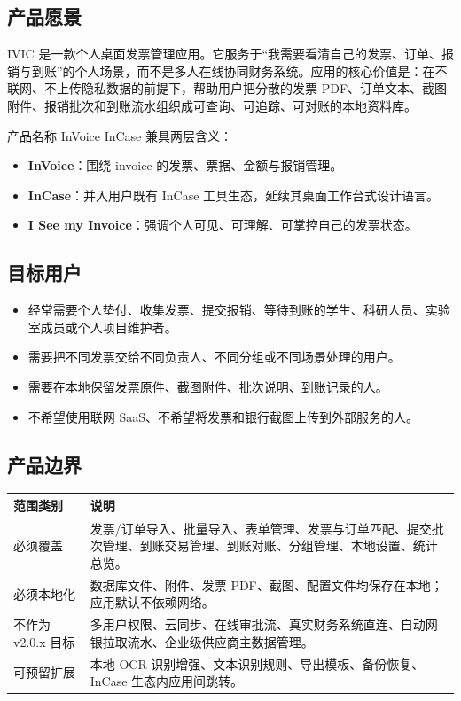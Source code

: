 \documentclass[UTF8,zihao=-4]{ctexart}
\begin{document}
\subsection{产品愿景}

IVIC 是一款个人桌面发票管理应用。它服务于“我需要看清自己的发票、订单、报销与到账”的个人场景，而不是多人在线协同财务系统。应用的核心价值是：在不联网、不上传隐私数据的前提下，帮助用户把分散的发票 PDF、订单文本、截图附件、报销批次和到账流水组织成可查询、可追踪、可对账的本地资料库。

产品名称 InVoice InCase 兼具两层含义：

\begin{itemize}
  \item \textbf{InVoice}：围绕 invoice 的发票、票据、金额与报销管理。
  \item \textbf{InCase}：并入用户既有 InCase 工具生态，延续其桌面工作台式设计语言。
  \item \textbf{I See my Invoice}：强调个人可见、可理解、可掌控自己的发票状态。
\end{itemize}

\subsection{目标用户}

\begin{itemize}
  \item 经常需要个人垫付、收集发票、提交报销、等待到账的学生、科研人员、实验室成员或个人项目维护者。
  \item 需要把不同发票交给不同负责人、不同分组或不同场景处理的用户。
  \item 需要在本地保留发票原件、截图附件、批次说明、到账记录的人。
  \item 不希望使用联网 SaaS、不希望将发票和银行截图上传到外部服务的人。
\end{itemize}

\subsection{产品边界}

\begin{longtable}{p{4.0cm}p{10.4cm}}
\toprule
范围类别 & 说明 \\
\midrule
必须覆盖 & 发票/订单导入、批量导入、表单管理、发票与订单匹配、提交批次管理、到账交易管理、到账对账、分组管理、本地设置、统计总览。 \\
必须本地化 & 数据库文件、附件、发票 PDF、截图、配置文件均保存在本地；应用默认不依赖网络。 \\
不作为 v2.0.x 目标 & 多用户权限、云同步、在线审批流、真实财务系统直连、自动网银拉取流水、企业级供应商主数据管理。 \\
可预留扩展 & 本地 OCR 识别增强、文本识别规则、导出模板、备份恢复、InCase 生态内应用间跳转。 \\
\bottomrule
\end{longtable}
\end{document}
